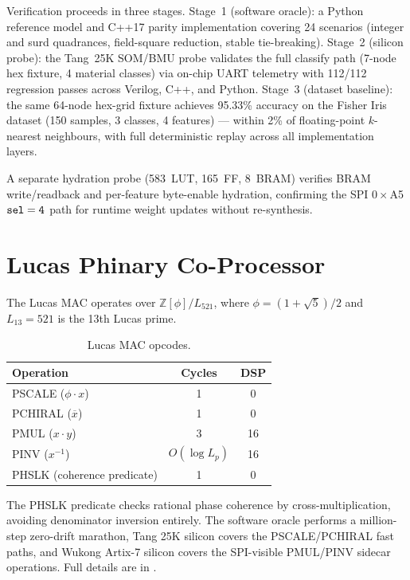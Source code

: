 \documentclass[10pt,twocolumn]{article}
\begin{document}
Verification proceeds in three stages.  Stage~1 (software oracle): a Python
reference model and C++17 parity implementation covering 24 scenarios
(integer and surd quadrances, field-square reduction, stable tie-breaking).
Stage~2 (silicon probe): the Tang~25K SOM/BMU probe validates the full
classify path (7-node hex fixture, 4 material classes) via on-chip UART
telemetry with 112/112 regression passes across Verilog, C++, and Python.
Stage~3 (dataset baseline): the same 64-node hex-grid fixture achieves
95.33\% accuracy on the Fisher Iris dataset (150 samples, 3 classes, 4
features) --- within 2\% of floating-point $k$-nearest neighbours, with full
deterministic replay across all implementation layers.

A separate hydration probe (583~LUT, 165~FF, 8~BRAM) verifies BRAM
write/readback and per-feature byte-enable hydration, confirming the SPI
$0\times$A5 $\tt sel=4$ path for runtime weight updates without
re-synthesis.

\section{Lucas Phinary Co-Processor}
\label{sec:lucas}

The Lucas MAC operates over $\mathbb{Z}[\phi]/L_{521}$, where
$\phi = (1+\sqrt{5})/2$ and $L_{13}=521$ is the 13th Lucas prime.

\begin{table}[h]
\centering
\begin{tabular}{lcc}
\toprule
Operation & Cycles & DSP \\
\midrule
PSCALE  ($\phi\cdot x$)        & 1 & 0 \\
PCHIRAL ($\overline{x}$)       & 1 & 0 \\
PMUL    ($x\cdot y$)           & 3 & 16 \\
PINV    ($x^{-1}$)             & $O(\log L_p)$ & 16 \\
PHSLK   (coherence predicate)  & 1 & 0 \\
\bottomrule
\end{tabular}
\caption{Lucas MAC opcodes.}
\end{table}

The PHSLK predicate checks rational phase coherence by cross-multiplication,
avoiding denominator inversion entirely. The software oracle performs a
million-step zero-drift marathon, Tang 25K silicon covers the PSCALE/PCHIRAL
fast paths, and Wukong Artix-7 silicon covers the SPI-visible PMUL/PINV
sidecar operations. Full details are in \cite{lucas2026}.
\end{document}
